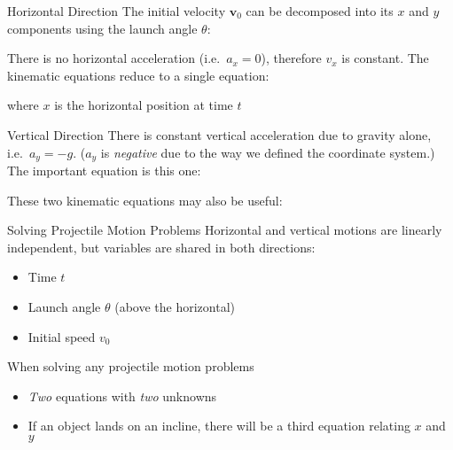 \documentclass[12pt,compress,aspectratio=169]{beamer}
\newcommand{\iii}{\ensuremath\hat{\bm{\imath}}}
\newcommand{\jjj}{\ensuremath\hat{\bm{\jmath}}}
\begin{document}
\begin{frame}{Horizontal Direction}
  The initial velocity $\bm{v}_0$ can be decomposed into its $x$ and $y$
  components using the launch angle $\theta$:

  \eq{-.2in}{
    \bm{v}_0=v_x\iii + v_y\jjj =
    \left[v_0\cos\theta\right]\iii + \left[v_0\sin\theta\right]\jjj
  }

  There is no horizontal acceleration (i.e.\ $a_x=\num{0}$), therefore $v_x$ is
  constant. The kinematic equations reduce to a single equation:


  where $x$ is the horizontal position at time $t$ %
\end{frame}




\begin{frame}{Vertical Direction}
  There is constant vertical acceleration due to gravity alone, i.e.\
  $a_y=-g$. ($a_y$ is \emph{negative} due to the way we defined the
  coordinate system.) The important equation is this one:


  These two kinematic equations may also be useful:

  \vspace{-.3in}{\Large
    \begin{align*}
      v_y &= \left[v_0\sin\theta\right] -gt\\
      v_y^2&=\left[v_0^2\sin^2\theta\right]-2gy
    \end{align*}
  }
\end{frame}



\begin{frame}{Solving Projectile Motion Problems}
  Horizontal and vertical motions are linearly independent, but variables are
  shared in both directions:
  \begin{itemize}
  \item Time $t$
  \item Launch angle $\theta$ (above the horizontal)
  \item Initial speed $v_0$
  \end{itemize}
  
  \vspace{.25in}When solving any projectile motion problems
  \begin{itemize}
  \item \emph{Two} equations with \emph{two} unknowns
  \item If an object lands on an incline, there will be a third equation
    relating $x$ and $y$
  \end{itemize}
\end{frame}
\end{document}
